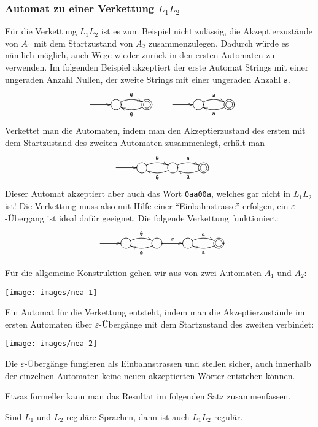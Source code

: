 \subsubsection{Automat zu einer Verkettung $L_1L_2$}
Für die Verkettung $L_1L_2$ ist es zum Beispiel
nicht zulässig, die Akzeptierzustände von
$A_1$ mit dem Startzustand von $A_2$ zusammenzulegen.
Dadurch
würde es nämlich möglich, auch Wege wieder zurück in
den ersten Automaten zu verwenden.
Im folgenden Beispiel akzeptiert der erste Automat Strings mit
einer ungeraden Anzahl Nullen, der zweite Strings mit einer
ungeraden Anzahl {\tt a}.
\[
\entrymodifiers={++[o][F]}
\xymatrix{
*+\txt{}\ar[r]
	&{} \ar@/^/[r]^{\tt 0}
		&*++[o][F=]{} \ar@/^/[l]^{\tt 0}
			&*\txt{}\ar[r]
				&{} \ar@/^/[r]^{\tt a}
					&*++[o][F=]{} \ar@/^/[l]^{\tt a }
}
\]
Verkettet man die Automaten, indem man den Akzeptierzustand des
ersten mit dem Startzustand des zweiten Automaten zusammenlegt,
erhält man
\[
\entrymodifiers={++[o][F]}
\xymatrix{
*+\txt{}\ar[r]
	&{} \ar@/^/[r]^{\tt 0}
		&{} \ar@/^/[l]^{\tt 0}
				 \ar@/^/[r]^{\tt a}
					&*++[o][F=]{} \ar@/^/[l]^{\tt a }
}
\]
Dieser Automat akzeptiert aber auch das Wort {\tt 0aa00a}, welches
gar nicht in $L_1L_2$ ist! Die Verkettung muss also mit Hilfe
einer ``Einbahnstrasse'' erfolgen, ein $\varepsilon$-Übergang
ist ideal dafür geeignet.
Die folgende Verkettung funktioniert:
\[
\entrymodifiers={++[o][F]}
\xymatrix{
*+\txt{}\ar[r]
	&{} \ar@/^/[r]^{\tt 0}
		&{} \ar@/^/[l]^{\tt 0} \ar[r]^{\varepsilon}
			&{} \ar@/^/[r]^{\tt a}
				&*++[o][F=]{} \ar@/^/[l]^{\tt a }
}
\]

Für die allgemeine Konstruktion gehen wir aus
von zwei Automaten $A_1$ und $A_2$:
\begin{center}
\texttt{[image: images/nea-1]}
\end{center}
Ein Automat für die Verkettung entsteht, indem man
die Akzeptierzustände im ersten Automaten über
$\varepsilon$-Übergänge mit dem
Startzustand des zweiten verbindet:
\begin{center}
\texttt{[image: images/nea-2]}
\end{center}
Die $\varepsilon$-Übergänge
fungieren als Einbahnstrassen und stellen sicher, auch innerhalb der
einzelnen Automaten keine neuen akzeptierten Wörter entstehen können.

Etwas formeller kann man das Resultat im folgenden Satz zusammenfassen.

\begin{satz}
\label{satz_concat}
Sind $L_1$ und $L_2$ reguläre Sprachen, dann ist auch $L_1L_2$
regulär.
\end{satz}

